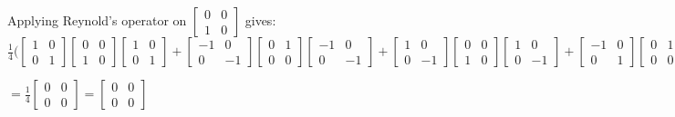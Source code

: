 \documentclass[a4paper]{article}
\begin{document}
Applying Reynold's operator on $\begin{bmatrix} 0 & 0 \\ 1 & 0 \end{bmatrix}$ gives:\\
$    \frac{1}{4} \Bigg(\begin{bmatrix} 1 & 0 \\ 0 & 1 \end{bmatrix} \begin{bmatrix} 0 & 0 \\ 1 & 0\end{bmatrix} \begin{bmatrix} 1 & 0 \\ 0 & 1 \end{bmatrix} + 
\begin{bmatrix} -1 & 0 \\ 0 & -1 \end{bmatrix} \begin{bmatrix} 0 & 1 \\ 0 & 0\end{bmatrix} \begin{bmatrix} -1 & 0 \\ 0 & -1 \end{bmatrix} +  
\begin{bmatrix} 1 & 0 \\ 0 & -1 \end{bmatrix} \begin{bmatrix} 0 & 0 \\ 1 & 0\end{bmatrix} \begin{bmatrix} 1 & 0 \\ 0 & -1 \end{bmatrix} + 
\begin{bmatrix} -1 & 0 \\ 0 & 1 \end{bmatrix} \begin{bmatrix} 0 & 1 \\ 0 & 0\end{bmatrix} \begin{bmatrix} -1 & 0 \\ 0 & 1 \end{bmatrix} \Bigg)$\\
\begin{center}
$= \frac{1}{4}\begin{bmatrix} 0 & 0 \\ 0 & 0 \end{bmatrix} = \begin{bmatrix} 0 & 0 \\ 0 & 0 \end{bmatrix} $
\end{center}
\end{document}
